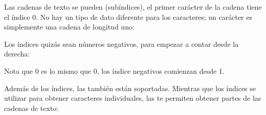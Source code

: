 \documentclass[a5paper,10pt,spanish]{sphinxmanual}
\begin{document}
\sphinxAtStartPar
Las cadenas de texto se pueden  (subíndices), el primer carácter de la cadena tiene el índice 0. No hay un tipo de dato diferente para los caracteres; un carácter es simplemente una cadena de longitud uno:

\begin{sphinxVerbatim}[commandchars=\\\{\}]
  
\PYG{p}{[}\PYG{p}{]}  
\PYG{p}{[}\PYG{p}{]}  
\end{sphinxVerbatim}

\sphinxAtStartPar
Los índices quizás sean números negativos, para empezar a contar desde la derecha:

\begin{sphinxVerbatim}[commandchars=\\\{\}]
\PYG{p}{[}\PYG{p}{]}  
\PYG{p}{[}\PYG{p}{]}  
\PYG{p}{[}\PYG{p}{]}
\end{sphinxVerbatim}

\sphinxAtStartPar
Nota que \sphinxhyphen{}0 es lo mismo que 0, los índice negativos comienzan desde \sphinxhyphen{}1.

\sphinxAtStartPar
Además de los índices, las  también están soportadas. Mientras que los índices se utilizar para obtener caracteres individuales, las  te permiten obtener partes de las cadenas de texto:

\begin{sphinxVerbatim}[commandchars=\\\{\}]
\PYG{p}{[}\PYG{p}{]}  
\PYG{p}{[}\PYG{p}{]}  
\end{sphinxVerbatim}
\end{document}
